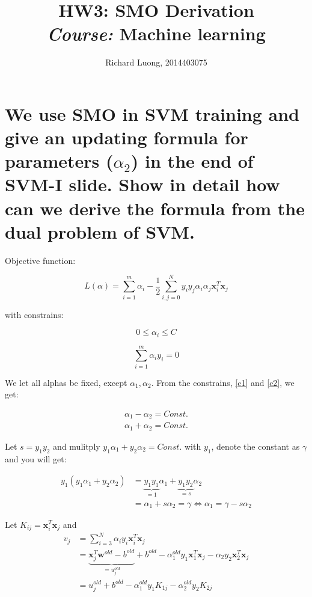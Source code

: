 \documentclass[a4paper]{article}
\author{Richard Luong, 2014403075}
\title{HW3: SMO Derivation\\ 
\large \emph{Course: }Machine learning}
\begin{document}
\maketitle

\section{We use SMO in SVM training and give an updating formula for parameters ($\alpha_2$) in the end of SVM-I slide. Show in detail how can we derive the formula from the dual problem of SVM.}

Objective function:

\begin{equation}
\label{loss}
L(\alpha) = \sum \limits_{i=1}^{m} \alpha_i - \frac{1}{2} \sum \limits_{i,j=0}^{N} y_i y_j \alpha_i \alpha_j \mathbf{x}_i ^T \mathbf{x}_j
\end{equation}

with constrains:

\begin{equation}
\label{c1}
0 \le \alpha_i \le C
\end{equation}

\begin{equation}
\label{c2}
\sum \limits_{i = 1} ^{m} \alpha_i y_i = 0
\end{equation}

We let all alphas be fixed, except $\alpha_1, \alpha_2$. From the constrains, \eqref{c1} and \eqref{c2}, we get:

\begin{gather}
\label{c1_new}
\alpha_1 - \alpha_2 = Const. \\
\label{c2_new}
\alpha_1 + \alpha_2 = Const.
\end{gather}

Let $s = y_1 y_2$ and mulitply $y_1\alpha_1 + y_2 \alpha_2 = Const.$ with $y_1$, denote the constant as $\gamma$ and you will get:

\begin{align}
\label{a3}
y_1 (y_1\alpha_1 + y_2 \alpha_2) &= \underbrace{y_1y_1}_{=1}\alpha_1 + \underbrace{y_1y_2}_{=s} \alpha_2 \\
\label{a3_1}
&= \alpha_1 + s\alpha_2 = \gamma \Leftrightarrow \alpha_1 = \gamma - s\alpha_2
\end{align}

Let $K_{ij} = \mathbf{x}_i ^T \mathbf{x}_j$ and
\begin{align}
\label{a4}
v_j &= \sum \limits_{i = 3} ^ {N} \alpha_i y_i \mathbf{x}_i ^T \mathbf{x}_j \\
&= \underbrace{\mathbf{x}_j ^T \mathbf{w}^{old} - b^{old}}_{= u_j^{old}} + b^{old} - \alpha_1^{old}y_1 \mathbf{x}_1 ^T \mathbf{x}_j-\alpha_2 y_2 \mathbf{x}_2 ^T \mathbf{x}_j \\
&= u_j^{old} + b^{old} - \alpha_1^{old}y_1K_{1j} - \alpha_2^{old}y_2K_{2j}
\end{align}
\end{document}
